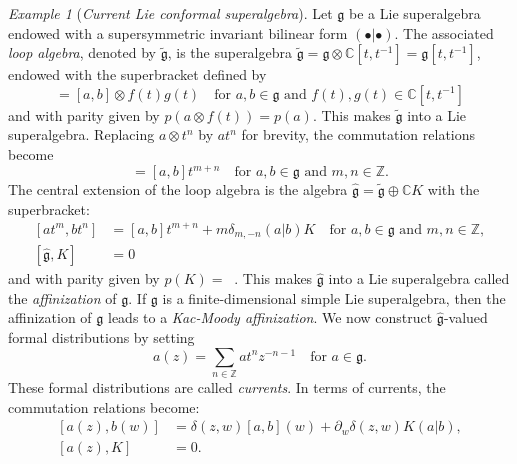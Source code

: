 \documentclass[a4paper, 12pt, reqno]{amsart}
\theoremstyle{remark}
\newtheorem{example}[theorem]{Example}
\numberwithin{equation}{subsection}
\DeclareMathOperator{\zero}{\overline{0}}
\begin{document}
\begin{example}[\emph{Current Lie conformal superalgebra}]
  Let $\mathfrak{g}$ be a Lie superalgebra endowed with a supersymmetric invariant bilinear form $(\bullet| \bullet)$.
  The associated \emph{loop algebra}, denoted by $\tilde{\mathfrak{g}}$, is the superalgebra $\tilde{\mathfrak{g}} = \mathfrak{g} \otimes \mathbb{C}[t, t^{-1}] = \mathfrak{g}[t, t^{-1}]$, endowed with the superbracket defined by
  \begin{equation*}
    [a\otimes f(t), b\otimes g(t)] = [a, b]\otimes f(t)g(t) \quad \text{for }a, b \in \mathfrak{g}\text{ and }f(t), g(t) \in \mathbb{C}[t, t^{-1}]
  \end{equation*}
  and with parity given by $p(a\otimes f(t)) = p(a)$.
  This makes $\tilde{\mathfrak{g}}$ into a Lie superalgebra.
  Replacing $a\otimes t^n$ by $at^n$ for brevity, the commutation relations become
  \begin{equation*}
    [at^m, bt^n] = [a, b]t^{m + n} \quad \text{for }a, b \in \mathfrak{g}\text{ and }m, n \in \mathbb{Z}.
  \end{equation*}
  The central extension of the loop algebra is the algebra $\hat{\mathfrak{g}} = \tilde{\mathfrak{g}} \oplus \mathbb{C}K$ with the superbracket:
  \begin{equation*}
    \begin{split}
    [at^m, bt^n] &= [a, b]t^{m + n} + m\delta_{m, -n}(a| b)K \quad \text{for }a, b \in \mathfrak{g}\text{ and }m, n \in \mathbb{Z}, \\
    [\hat{\mathfrak{g}}, K] &= 0
    \end{split}
  \end{equation*}
  and with parity given by $p(K) = \zero$.
  This makes $\hat{\mathfrak{g}}$ into a Lie superalgebra called the \emph{affinization} of $\mathfrak{g}$.
  If $\mathfrak{g}$ is a finite-dimensional simple Lie superalgebra, then the affinization of $\mathfrak{g}$ leads to a \emph{Kac-Moody affinization}.
  We now construct $\hat{\mathfrak{g}}$-valued formal distributions by setting
  \begin{equation*}
    a(z) = \sum_{n \in \mathbb{Z}}at^nz^{-n - 1} \quad \text{for }a \in \mathfrak{g}.
  \end{equation*}
  These formal distributions are called \emph{currents}.
  In terms of currents, the commutation relations become:
  \begin{equation*}
    \begin{split}
    [a(z), b(w)] &= \delta(z, w)[a, b](w) + \partial_w\delta(z, w)K(a| b), \\
    [a(z), K] &= 0.
    \end{split}

\end{equation*}
\end{example}
\end{document}
